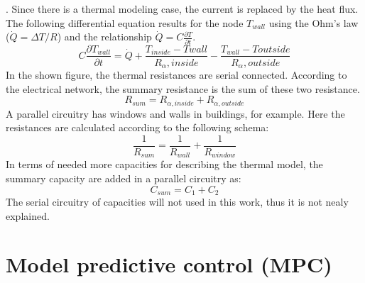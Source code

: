     \cite{Kuchling.2007}. 
    Since there is a thermal modeling case, the current is replaced by the heat flux. The following differential equation results for the node  $T_{wall}$ using the Ohm's law ($\dot{Q}=\Delta T/R$) and the relationship $\dot{Q}=C\frac{\partial T}{\partial t}$.     
    \begin{equation}
    \label{eq:sampledifferential}
    C \frac{\partial T_{wall}}{\partial t} = \dot{Q} + \frac{T_{inside}-T{wall}}{R_\alpha,inside} - \frac{T_{wall}-T{outside}}{R_\alpha,outside}
    \end{equation}
    In the shown figure, the thermal resistances are serial connected. According to the electrical network, the summary resistance is the sum of these two resistance. 
    \begin{equation}
    \label{eq:resistanceseriel}
        R_{sum} = R_{\alpha,inside} + R_{\alpha,outside}
    \end{equation}
    A parallel circuitry has windows and walls in buildings, for example. Here the resistances are calculated according to the following schema:
    \begin{equation}
    \label{eq:resistancesparallel}
        \frac{1}{R_{sum}} = \frac{1}{R_{wall}} + \frac{1}{R_{window}}
    \end{equation}
    In terms of needed more capacities for describing the thermal model, the summary capacity are added in a parallel circuitry as: 
    \begin{equation}
    \label{eq:capacity}
         C_{sum} = C_1 + C_2
    \end{equation}
    The serial circuitry of capacities will not used in this work, thus it is not nealy explained.


\section{Model predictive control (MPC)}
\label{section:mpc}

